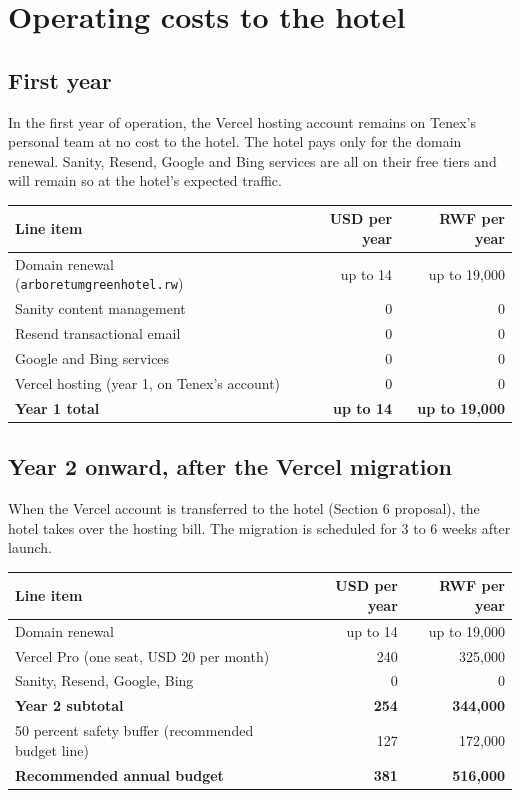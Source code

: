 \documentclass[11pt,a4paper]{article}
\begin{document}
\section{Operating costs to the hotel}

\subsection{First year}

In the first year of operation, the Vercel hosting account remains on Tenex's personal team at no cost to the hotel. The hotel pays only for the domain renewal. Sanity, Resend, Google and Bing services are all on their free tiers and will remain so at the hotel's expected traffic.

\begin{tabularx}{\textwidth}{@{} X r r @{}}
\toprule
\textbf{Line item} & \textbf{USD per year} & \textbf{RWF per year} \\
\midrule
Domain renewal (\texttt{arboretumgreenhotel.\allowbreak rw}) & up to 14 & up to 19{,}000 \\
Sanity content management & 0 & 0 \\
Resend transactional email & 0 & 0 \\
Google and Bing services & 0 & 0 \\
Vercel hosting (year 1, on Tenex's account) & 0 & 0 \\
\midrule
\textbf{Year 1 total} & \textbf{up to 14} & \textbf{up to 19{,}000} \\
\bottomrule
\end{tabularx}

\subsection{Year 2 onward, after the Vercel migration}

When the Vercel account is transferred to the hotel (Section 6 proposal), the hotel takes over the hosting bill. The migration is scheduled for 3 to 6 weeks after launch.

\begin{tabularx}{\textwidth}{@{} X r r @{}}
\toprule
\textbf{Line item} & \textbf{USD per year} & \textbf{RWF per year} \\
\midrule
Domain renewal & up to 14 & up to 19{,}000 \\
Vercel Pro (one seat, USD 20 per month) & 240 & 325{,}000 \\
Sanity, Resend, Google, Bing & 0 & 0 \\
\midrule
\textbf{Year 2 subtotal} & \textbf{254} & \textbf{344{,}000} \\
50 percent safety buffer (recommended budget line) & 127 & 172{,}000 \\
\midrule
\textbf{Recommended annual budget} & \textbf{381} & \textbf{516{,}000} \\
\bottomrule
\end{tabularx}
\end{document}
